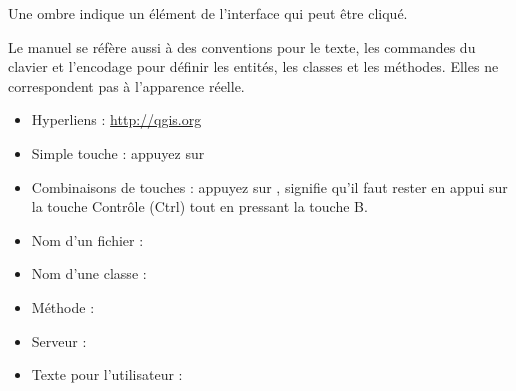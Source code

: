 \begin{itemize}[label=--,itemsep=5pt]
\end{itemize}
Une ombre indique un élément de l'interface qui peut être cliqué.


Le manuel se réfère aussi à des conventions pour le texte, les commandes du clavier et l'encodage pour définir les entités, les classes et les méthodes. Elles ne correspondent pas à l'apparence réelle.

\begin{itemize}[label=--]
\item Hyperliens : \url{http://qgis.org}
\item Simple touche : appuyez sur 
\item Combinaisons de touches : appuyez sur , signifie qu'il faut rester en appui sur la touche Contrôle (Ctrl) tout en pressant la touche B.
\item Nom d'un fichier : 
\item Nom d'une classe : 
\item Méthode : 
\item Serveur : 
\item Texte pour l'utilisateur : 
\end{itemize}

